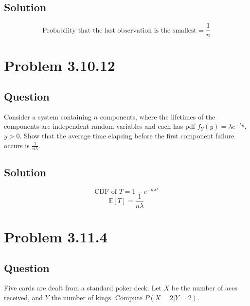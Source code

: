 \documentclass[12pt]{article}
\begin{document}
\subsection*{Solution}
\[
\text{Probability that the last observation is the smallest} = \frac{1}{n}
\]
\pagebreak

\section*{Problem 3.10.12}
\subsection*{Question}
Consider a system containing \( n \) components, where the lifetimes of the components are independent random variables and each has pdf \( f_Y(y) = \lambda e^{-\lambda y} \), \( y > 0 \). Show that the average time elapsing before the first component failure occurs is \( \frac{1}{n\lambda} \).

\subsection*{Solution}
\[
\text{CDF of } T = 1 - e^{-n\lambda t}
\]
\[
\mathbb{E}[T] = \frac{1}{n\lambda}
\]
\pagebreak

\section*{Problem 3.11.4}
\subsection*{Question}
Five cards are dealt from a standard poker deck. Let \( X \) be the number of aces received, and \( Y \) the number of kings. Compute \( P(X = 2 | Y = 2) \).
\end{document}
